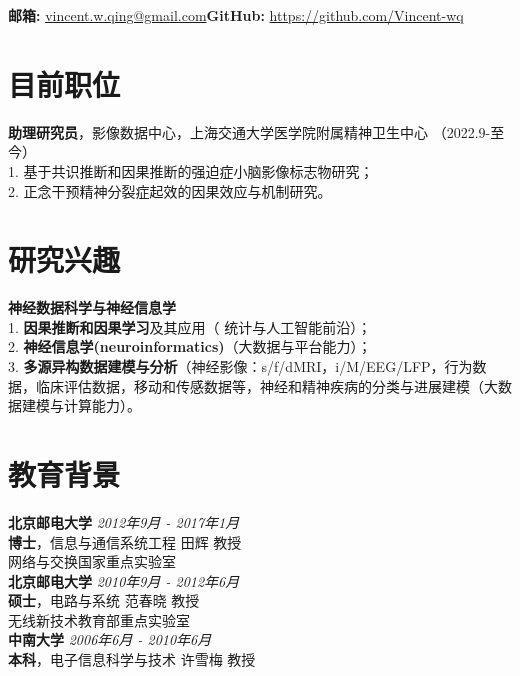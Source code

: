 \documentclass{resume}
\begin{document}


 {\textbf{邮箱:} \href{mailto:vincent.w.qing@gmail.com}{vincent.w.qing@gmail.com}}{\textbf{GitHub:} \href{https://github.com/Vincent-wq}{https://github.com/Vincent-wq}}{}

 
\section{目前职位}
\textbf{助理研究员}，影像数据中心，上海交通大学医学院附属精神卫生中心 （2022.9-至今）\textbf{}\\
1. 基于共识推断和因果推断的强迫症小脑影像标志物研究；\\
2. 正念干预精神分裂症起效的因果效应与机制研究。

\section{研究兴趣}
{\bf 神经数据科学与神经信息学}\\
1. {\bf 因果推断和因果学习}及其应用（ 统计与人工智能前沿）；\\
2. {\bf 神经信息学(neuroinformatics)}（大数据与平台能力）；\\
3. {\bf 多源异构数据建模与分析}（神经影像：s/f/dMRI，i/M/EEG/LFP，行为数据，临床评估数据，移动和传感数据等，神经和精神疾病的分类与进展建模（大数据建模与计算能力）。 \\

\section{教育背景}
{\bf 北京邮电大学} \hfill {\em 2012年9月 - 2017年1月} \\
\textbf{博士}，信息与通信系统工程 \hfill {田辉 教授}\\
网络与交换国家重点实验室\\
{\bf 北京邮电大学} \hfill {\em 2010年9月 - 2012年6月} \\
\textbf{硕士}，电路与系统 \hfill {范春晓 教授}\\
无线新技术教育部重点实验室\\
{\bf 中南大学} \hfill {\em 2006年6月 - 2010年6月} \\
\textbf{本科}，电子信息科学与技术 \hfill {许雪梅 教授}
\end{document}
